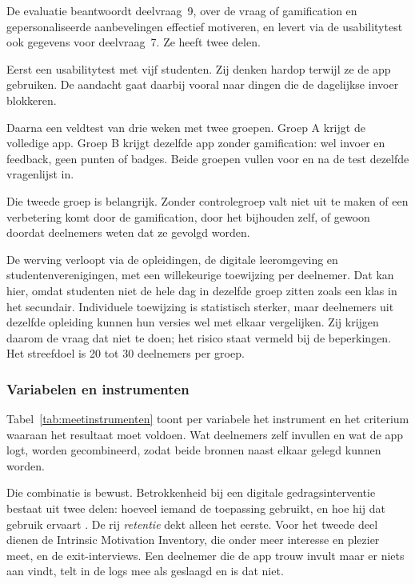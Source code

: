 \documentclass{hogent-article}
\begin{document}
    De evaluatie beantwoordt deelvraag~9, over de vraag of gamification en
    gepersonaliseerde aanbevelingen effectief motiveren, en levert via de
    usabilitytest ook gegevens voor deelvraag~7. Ze heeft twee delen.
    
    Eerst een usabilitytest met vijf studenten. Zij denken hardop terwijl ze de app
    gebruiken. De aandacht gaat daarbij vooral naar dingen die de dagelijkse invoer
    blokkeren.
    
    Daarna een veldtest van drie weken met twee groepen. Groep A krijgt de volledige
    app. Groep B krijgt dezelfde app zonder gamification: wel invoer en feedback,
    geen punten of badges. Beide groepen vullen voor en na de test dezelfde
    vragenlijst in.
    
    Die tweede groep is belangrijk. Zonder controlegroep valt niet uit te maken of
    een verbetering komt door de gamification, door het bijhouden zelf, of gewoon
    doordat deelnemers weten dat ze gevolgd worden.
    
    De werving verloopt via de opleidingen, de digitale leeromgeving en
    studentenverenigingen, met een willekeurige toewijzing per deelnemer. Dat kan
    hier, omdat studenten niet de hele dag in dezelfde groep zitten zoals een klas
    in het secundair. Individuele toewijzing is statistisch sterker, maar deelnemers
    uit dezelfde opleiding kunnen hun versies wel met elkaar vergelijken. Zij
    krijgen daarom de vraag dat niet te doen; het risico staat vermeld bij de
    beperkingen. Het streefdoel is 20 tot 30 deelnemers per groep.
    
    \subsubsection{Variabelen en instrumenten}
    \label{sssec:watmetenwe2}
    
    Tabel~\ref{tab:meetinstrumenten} toont per variabele het instrument en het
    criterium waaraan het resultaat moet voldoen. Wat deelnemers zelf invullen en
    wat de app logt, worden gecombineerd, zodat beide bronnen naast elkaar gelegd
    kunnen worden.
    
    Die combinatie is bewust. Betrokkenheid bij een digitale gedragsinterventie
    bestaat uit twee delen: hoeveel iemand de toepassing gebruikt, en hoe hij dat
    gebruik ervaart \autocite{Perski2017}. De rij \emph{retentie} dekt alleen het
    eerste. Voor het tweede deel dienen de Intrinsic Motivation Inventory, die onder
    meer interesse en plezier meet, en de exit-interviews. Een deelnemer die de app
    trouw invult maar er niets aan vindt, telt in de logs mee als geslaagd en is dat
    niet.
    
\end{document}

